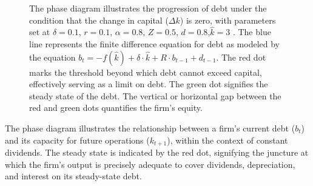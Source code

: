 \documentclass[12pt]{article}
\begin{document}
\begin{figure}
    \centering
    \caption{The phase diagram illustrates the progression of debt under the condition that the change in capital (\(\Delta k\))
    is zero, with parameters set at \(\delta = 0.1\), \(r = 0.1\), \(\alpha = 0.8\), \(Z = 0.5\), \(d = 0.8\),\(\widehat{k} = 3\) . The
    blue line represents the finite difference equation for debt as modeled by the equation \(b_{t} =  - f(\widehat{k}) + \delta \cdot \widehat{k} + R
    \cdot b_{t-1} + d_{t-1}\). The red dot marks the threshold beyond which debt cannot exceed capital, effectively serving
    as a limit 
    on debt. The green dot signifies the steady state of the debt. The vertical or horizontal gap between the red and
    green dots quantifies the firm's equity. 
    }
\end{figure}
The phase diagram illustrates the relationship between a firm's current debt (\(b_t\)) and its capacity for future operations
(\(k_{t+1}\)), within the context of constant dividends. The steady state is indicated by the red dot, signifying the
juncture at which the firm's output is precisely adequate to cover dividends, depreciation, and interest on its
steady-state debt. 
\end{document}
